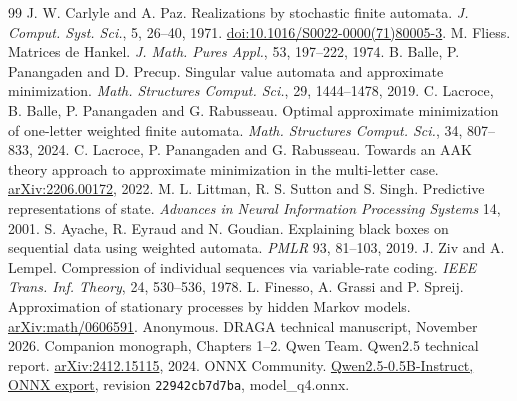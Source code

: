 \begin{thebibliography}{99}
 J. W. Carlyle and A. Paz. Realizations by stochastic finite automata. \emph{J. Comput. Syst. Sci.}, 5, 26--40, 1971. \href{https://doi.org/10.1016/S0022-0000(71)80005-3}{doi:10.1016/S0022-0000(71)80005-3}.
 M. Fliess. Matrices de Hankel. \emph{J. Math. Pures Appl.}, 53, 197--222, 1974.
 B. Balle, P. Panangaden and D. Precup. Singular value automata and approximate minimization. \emph{Math. Structures Comput. Sci.}, 29, 1444--1478, 2019.
 C. Lacroce, B. Balle, P. Panangaden and G. Rabusseau. Optimal approximate minimization of one-letter weighted finite automata. \emph{Math. Structures Comput. Sci.}, 34, 807--833, 2024.
 C. Lacroce, P. Panangaden and G. Rabusseau. Towards an AAK theory approach to approximate minimization in the multi-letter case. \href{https://arxiv.org/abs/2206.00172}{arXiv:2206.00172}, 2022.
 M. L. Littman, R. S. Sutton and S. Singh. Predictive representations of state. \emph{Advances in Neural Information Processing Systems} 14, 2001.
 S. Ayache, R. Eyraud and N. Goudian. Explaining black boxes on sequential data using weighted automata. \emph{PMLR} 93, 81--103, 2019.
 J. Ziv and A. Lempel. Compression of individual sequences via variable-rate coding. \emph{IEEE Trans. Inf. Theory}, 24, 530--536, 1978.
 L. Finesso, A. Grassi and P. Spreij. Approximation of stationary processes by hidden Markov models. \href{https://arxiv.org/abs/math/0606591}{arXiv:math/0606591}.
 Anonymous. DRAGA technical manuscript, November 2026. Companion monograph, Chapters 1--2.
 Qwen Team. Qwen2.5 technical report. \href{https://arxiv.org/abs/2412.15115}{arXiv:2412.15115}, 2024.
 ONNX Community. \href{https://huggingface.co/onnx-community/Qwen2.5-0.5B-Instruct/tree/22942cb7d7ba4cc81bb4673549ca4d4614469b5e}{Qwen2.5-0.5B-Instruct, ONNX export}, revision \texttt{22942cb7d7ba}, model\_q4.onnx.
\end{thebibliography}
